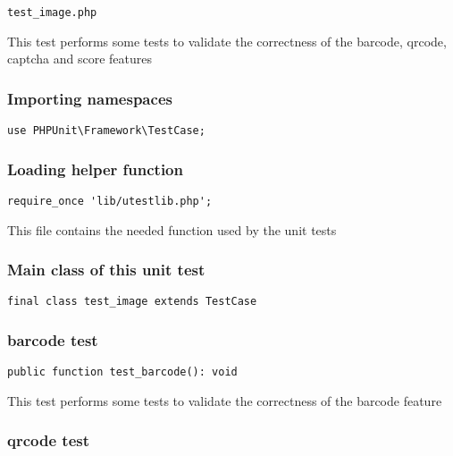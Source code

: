 \documentclass[a4paper]{article}
\begin{document}
\begin{lstlisting}
test_image.php
\end{lstlisting}

This test performs some tests to validate the correctness
of the barcode, qrcode, captcha and score features

\hypertarget{toc218}{}
\subsubsection{Importing namespaces}

\begin{lstlisting}
use PHPUnit\Framework\TestCase;
\end{lstlisting}

\hypertarget{toc219}{}
\subsubsection{Loading helper function}

\begin{lstlisting}
require_once 'lib/utestlib.php';
\end{lstlisting}

This file contains the needed function used by the unit tests

\hypertarget{toc220}{}
\subsubsection{Main class of this unit test}

\begin{lstlisting}
final class test_image extends TestCase
\end{lstlisting}

\hypertarget{toc221}{}
\subsubsection{barcode test}

\begin{lstlisting}
public function test_barcode(): void
\end{lstlisting}

This test performs some tests to validate the correctness
of the barcode feature

\hypertarget{toc222}{}
\subsubsection{qrcode test}
\end{document}
